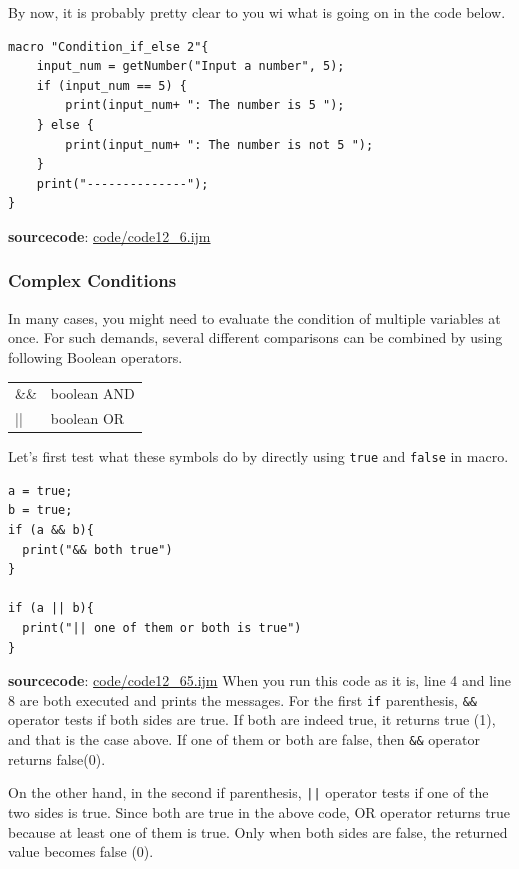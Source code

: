\documentclass[11pt,a4paper,oneside]{report}
\newenvironment{indentCom}
{\begin{list}{}
         {\setlength{\leftmargin}{1em}}
         \item[]
}
{\end{list}}
\newcommand{\ilcom}[1]{\texttt{\small#1}}
\begin{document}
By now, it is probably pretty clear to you wi what is going on in the code below. 

\begin{lstlisting}[morekeywords={*, if, else}]
macro "Condition_if_else 2"{
	input_num = getNumber("Input a number", 5);
	if (input_num == 5) {
		print(input_num+ ": The number is 5 ");
	} else {
		print(input_num+ ": The number is not 5 ");
	}
	print("--------------");
}

\end{lstlisting}
\textbf{sourcecode}: \href{http://www.example.com/contents}{code/code12\_6.ijm}

\subsubsection{Complex Conditions}
In many cases, you might need to evaluate the condition of multiple variables at once. 
For such demands, several different comparisons can be combined by using following Boolean operators. 

\begin{indentCom}
 \begin{tabular*}{0.5\textwidth}{ l l }
\&\& & boolean AND\\
|| & boolean OR\\
\end{tabular*}
\end{indentCom}

Let's first test what these symbols do by directly using
\ilcom{true} and \ilcom{false} in macro.

\begin{lstlisting}[morekeywords={*, if, else}]
a = true;
b = true;
if (a && b){
  print("&& both true")
}

if (a || b){
  print("|| one of them or both is true")
}

\end{lstlisting}
\textbf{sourcecode}: \href{http://www.example.com/contents}{code/code12\_65.ijm}
When you run this code as it is, line 4 and line 8 are both executed and prints
the messages. For the first \ilcom{if} parenthesis, \ilcom{\&\&} operator tests if
both sides are true. If both are indeed true, it returns true (1), and that is
the case above. If one of them or both are false, then \ilcom{\&\&}
operator returns false(0). 

On the other hand, in the second if parenthesis,
\ilcom{||} operator tests if one of the two sides is true. Since both are
true in the above code, OR operator returns true because at least one of them is
true. Only when both sides are false, the returned value becomes false (0).
\end{document}
